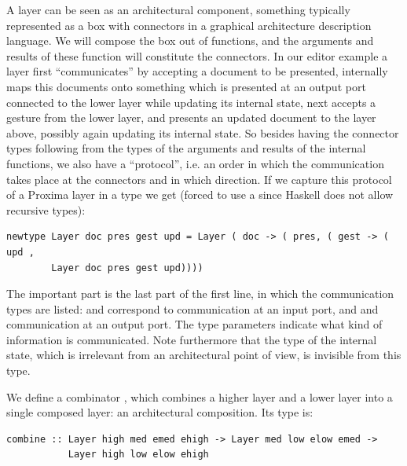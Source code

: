 \documentclass{llncs}
\begin{document}
A layer can be seen as an architectural component, something typically represented as a box with connectors in a graphical architecture description language. We will compose the box out of functions, and the arguments and results of these function will constitute the connectors. In our editor example a layer first ``communicates'' by accepting a document to be presented, internally maps this documents onto something which is presented at an output port connected to the lower layer while updating its internal state, next accepts a gesture from the lower layer, and presents an updated document to the layer above, possibly again updating its internal state. So besides having the connector types following from the types of the arguments and results of the internal functions, we also have a ``protocol'', i.e. an order in which the communication takes place at the connectors and in which direction. 
If we capture this protocol of a Proxima layer in a type we get (forced to use a  since Haskell does not allow recursive types):

\begin{small}
\begin{verbatim}
newtype Layer doc pres gest upd = Layer ( doc -> ( pres, ( gest -> ( upd , 
        Layer doc pres gest upd))))
\end{verbatim}
\end{small}

\noindent The important part is the last part of the first line, in which the communication types are listed:  and  correspond to communication at an input port, and  and  communication at an output port. The type parameters indicate what kind of information is communicated. Note furthermore that the type of the internal state, which is irrelevant from an architectural point of view, is invisible from this type.

We define a combinator , which combines a higher layer and a lower layer into a single composed layer: an architectural composition. Its type is:

\begin{small}
\begin{verbatim}
combine :: Layer high med emed ehigh -> Layer med low elow emed -> 
           Layer high low elow ehigh
\end{verbatim}
\end{small}
\end{document}

